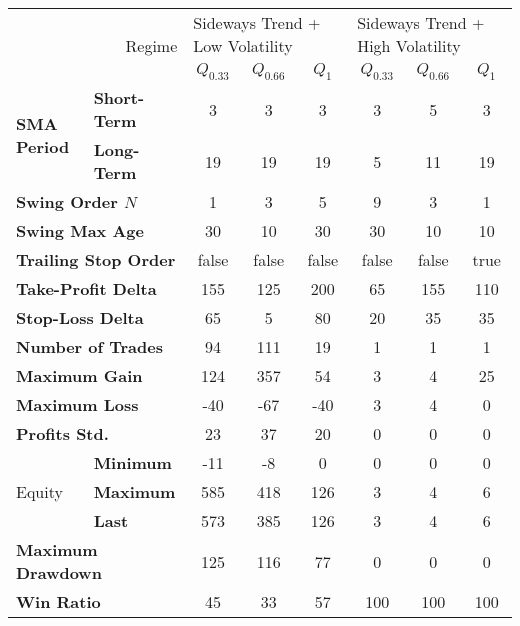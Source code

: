 \begin{tabular}{ll|cccccc}
    \toprule
    \multicolumn{2}{r|}{\multirow{2}{*}{Regime}} & \multicolumn{3}{l}{Sideways Trend + Low Volatility} & \multicolumn{3}{l}{Sideways Trend + High Volatility}  \\
    \multicolumn{2}{r|}{} & $Q_{0.33}$ & $Q_{0.66}$ & $Q_{1}$ & $Q_{0.33}$ & $Q_{0.66}$ & $Q_{1}$ \\
    \midrule
    \multirow{2}{*}{\textbf{SMA Period}} & \textbf{Short-Term} & 3   & 3   & 3   & 3 & 5  & 3  \\
    & \textbf{Long-Term}  & 19  & 19  & 19  & 5 & 11 & 19 \\
    \multicolumn{2}{l|}{\textbf{Swing Order $N$}} & 1 & 3 & 5 & 9 & 3 & 1 \\
    \multicolumn{2}{l|}{\textbf{Swing Max Age}} & 30 & 10 & 30 & 30 & 10 & 10 \\
    \multicolumn{2}{l|}{\textbf{Trailing Stop Order}} & false & false & false & false & false & true \\
    \multicolumn{2}{l|}{\textbf{Take-Profit Delta}} & 155 & 125 & 200 & 65 & 155 & 110 \\
    \multicolumn{2}{l|}{\textbf{Stop-Loss Delta}} & 65 & 5 & 80 & 20 & 35 & 35 \\
    \midrule
    \multicolumn{2}{l|}{\textbf{Number of Trades}} & 94 & 111 & 19 & 1 & 1 & 1 \\
    \multicolumn{2}{l|}{\textbf{Maximum Gain}} & 124 & 357 & 54 & 3 & 4 & 25 \\
    \multicolumn{2}{l|}{\textbf{Maximum Loss}} & -40 & -67 & -40 & 3 & 4 & 0 \\
    \multicolumn{2}{l|}{\textbf{Profits Std.}} & 23 & 37 & 20 & 0 & 0 & 0 \\
    \multirow{3}{*}{Equity}              & \textbf{Minimum}    & -11 & -8  & 0   & 0 & 0  & 0  \\
    & \textbf{Maximum}    & 585 & 418 & 126 & 3 & 4  & 6  \\
    & \textbf{Last}       & 573 & 385 & 126 & 3 & 4  & 6  \\
    \multicolumn{2}{l|}{\textbf{Maximum Drawdown}} & 125 & 116 & 77 & 0 & 0 & 0 \\
    \multicolumn{2}{l|}{\textbf{Win Ratio}} & 45 & 33 & 57 & 100 & 100 & 100 \\
    \bottomrule
\end{tabular}